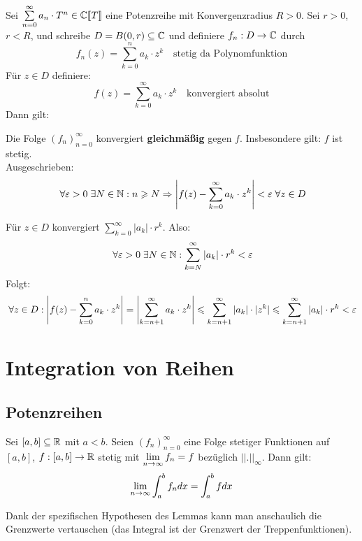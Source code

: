 \documentclass[main.tex]{subfiles}
\begin{document}
\begin{Theorem}
  Sei $\sum \limits_{n=0}^\infty a_n \cdot T^n \in \mathbb{C}[\![T]\!]$ eine Potenzreihe mit Konvergenzradius $R > 0$. Sei $r > 0$, $r < R$, und schreibe $D = B(0,r) \subseteq \mathbb{C}$ und definiere $f_n: D \to \mathbb{C}$ durch
  $$f_n(z) = \sum \limits_{k=0}^n a_k \cdot z^k \quad \text{stetig da Polynomfunktion}$$
  Für $z \in D$ definiere:
  $$f(z) = \sum_{k=0}^\infty a_k \cdot z^k \quad \text{konvergiert absolut}$$
  Dann gilt:

  Die Folge $(f_n)_{n=0}^\infty$ konvergiert \textbf{gleichmäßig} gegen $f$. Insbesondere gilt: $f$ ist stetig.\\
  Ausgeschrieben:
  $$\;\forall \varepsilon > 0 \;\exists N \in \mathbb{N} : n \geqslant N \Rightarrow \left|f(z) - \sum \limits_{k=0}^\infty a_k \cdot z^k \right| < \varepsilon \;\forall z \in D$$
\end{Theorem}

\begin{Beweis}
  Für $z \in D$ konvergiert $\sum \limits_{k=0}^\infty |a_k| \cdot r^k$. Also:
  $$\;\forall \varepsilon > 0 \;\exists N \in \mathbb{N} : \sum \limits_{k=N}^\infty |a_k| \cdot r^k < \varepsilon$$
  Folgt:
  $$\;\forall z \in D : \left|f(z) - \sum \limits_{k=0}^n a_k \cdot z^k \right| = \left|\sum \limits_{k=n+1}^\infty a_k \cdot z^k \right| \leqslant \sum \limits_{k=n+1}^\infty |a_k| \cdot |z^k| \leqslant \sum \limits_{k=n+1}^\infty |a_k| \cdot r^k < \varepsilon$$
\end{Beweis}


\section{Integration von Reihen}

\subsection{Potenzreihen}

\begin{Lemma}
  Sei $[a,b] \subseteq \mathbb{R}$ mit $a < b$. Seien $(f_n)_{n=0}^\infty$ eine Folge stetiger Funktionen auf $[a,b]$, $f:[a,b] \to \mathbb{R}$ stetig mit $\lim \limits_{n \to \infty} f_n = f$ bezüglich $||.||_\infty$. Dann gilt:
  $$\lim \limits_{n \to \infty} \int_a^b f_n dx = \int_a^b f dx$$
  \begin{Bemerkung}
    Dank der spezifischen Hypothesen des Lemmas kann man anschaulich die Grenzwerte vertauschen (das Integral ist der Grenzwert der Treppenfunktionen).
  \end{Bemerkung}
\end{Lemma}
\end{document}
